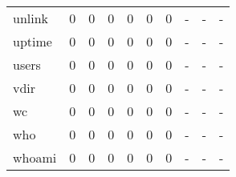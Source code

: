 \begin{longtable}{lp{2.0cm}p{2.0cm}p{2.0cm}p{2.0cm}p{2.0cm}p{2.0cm}p{2.0cm}p{2.0cm}p{2.0cm}}
unlink    &                      0 &                                             0 &                                            0 &                                           0 &                                            0 &                                          0 &                                    - &                                      - &                                    - \\
uptime    &                      0 &                                             0 &                                            0 &                                           0 &                                            0 &                                          0 &                                    - &                                      - &                                    - \\
users     &                      0 &                                             0 &                                            0 &                                           0 &                                            0 &                                          0 &                                    - &                                      - &                                    - \\
vdir      &                      0 &                                             0 &                                            0 &                                           0 &                                            0 &                                          0 &                                    - &                                      - &                                    - \\
wc        &                      0 &                                             0 &                                            0 &                                           0 &                                            0 &                                          0 &                                    - &                                      - &                                    - \\
who       &                      0 &                                             0 &                                            0 &                                           0 &                                            0 &                                          0 &                                    - &                                      - &                                    - \\
whoami    &                      0 &                                             0 &                                            0 &                                           0 &                                            0 &                                          0 &                                    - &                                      - &                                    - \\

\end{longtable}
